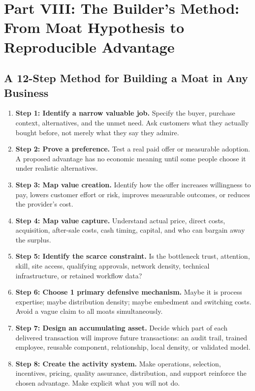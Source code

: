 \section*{Part VIII: The Builder's Method: From Moat Hypothesis to Reproducible Advantage}
\label{sec:part8_the_builders_method}

\subsection{A 12-Step Method for Building a Moat in Any Business}
\label{sec:twelve_step_method}

\begin{enumerate}
    \item \textbf{Step 1: Identify a narrow valuable job.} Specify the buyer, purchase context, alternatives, and the unmet need. Ask customers what they actually bought before, not merely what they say they admire.
    \item \textbf{Step 2: Prove a preference.} Test a real paid offer or measurable adoption. A proposed advantage has no economic meaning until some people choose it under realistic alternatives.
    \item \textbf{Step 3: Map value creation.} Identify how the offer increases willingness to pay, lowers customer effort or risk, improves measurable outcomes, or reduces the provider's cost.
    \item \textbf{Step 4: Map value capture.} Understand actual price, direct costs, acquisition, after-sale costs, cash timing, capital, and who can bargain away the surplus.
    \item \textbf{Step 5: Identify the scarce constraint.} Is the bottleneck trust, attention, skill, site access, qualifying approvals, network density, technical infrastructure, or retained workflow data?
    \item \textbf{Step 6: Choose 1 primary defensive mechanism.} Maybe it is process expertise; maybe distribution density; maybe embedment and switching costs. Avoid a vague claim to all moats simultaneously.
    \item \textbf{Step 7: Design an accumulating asset.} Decide which part of each delivered transaction will improve future transactions: an audit trail, trained employee, reusable component, relationship, local density, or validated model.
    \item \textbf{Step 8: Create the activity system.} Make operations, selection, incentives, pricing, quality assurance, distribution, and support reinforce the chosen advantage. Make explicit what you will not do.

\end{enumerate}
